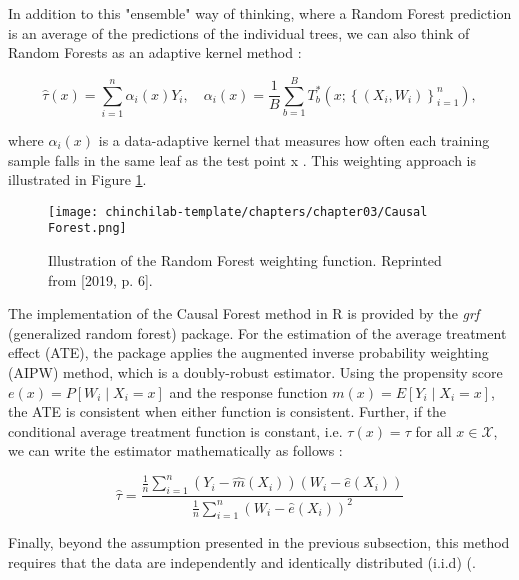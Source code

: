 In addition to this "ensemble" way of thinking, where a Random Forest prediction is an average of the predictions of the individual trees, we can also think of Random Forests as an adaptive kernel method \citep[p. 5]{atheywagerapplication}:

\begin{equation}
\hat{\tau}(x)=\sum_{i=1}^n \alpha_i(x) Y_i, \quad 
\alpha_i(x)=\frac{1}{B} \sum_{b=1}^B T_b^*\left(x ;\left\{\left(X_i, W_i\right)\right\}_{i=1}^n\right),
\end{equation}

where $\alpha_i(x)$ is a data-adaptive kernel that measures how often each training sample falls in the same leaf as the test point x \citep[p. 5]{atheywagerapplication}. This weighting approach is illustrated in Figure \ref{rfill}.

\begin{figure}
    \centering
    \texttt{[image: chinchilab-template/chapters/chapter03/Causal Forest.png]}
    \caption{Illustration of the Random Forest weighting function. Reprinted from \citeauthor{athey2019generalized} [2019, p. 6].}
    \label{rfill}
\end{figure}

The implementation of the Causal Forest method in R is provided by the \textit{grf} (generalized random forest) package. For the estimation of the average treatment effect (ATE), the package applies the augmented inverse probability weighting (AIPW) method, which is a doubly-robust estimator. Using the propensity score $e(x)=P\left[W_i \mid X_i=x\right]$ and the response function $m(x)=E\left[Y_i \mid X_i=x\right]$, the ATE is consistent when either function is consistent. Further, if the conditional average treatment function is constant, i.e. $\tau(x) = \tau$ for all $x \in \mathcal{X}$, we can write the estimator mathematically as follows \citep[p. 4]{atheywagerapplication}:

\begin{equation}
\hat{\tau}=\frac{\frac{1}{n} \sum_{i=1}^n\left(Y_i-\hat{m}\left(X_i\right)\right)\left(W_i-\hat{e}\left(X_i\right)\right)}{\frac{1}{n} \sum_{i=1}^n\left(W_i-\hat{e}\left(X_i\right)\right)^2}
\end{equation}

Finally, beyond the assumption presented in the previous subsection, this method requires that the data are independently and identically distributed (i.i.d) (\citep[p. 4]{atheywagerapplication}.

